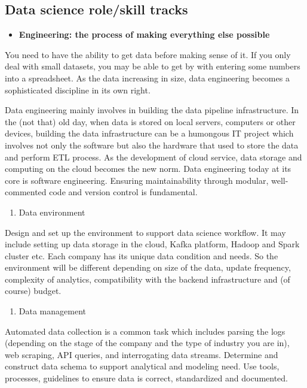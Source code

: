 \documentclass[12pt,]{krantz}
\providecommand{\tightlist}{%
  \setlength{\itemsep}{0pt}\setlength{\parskip}{0pt}}
\theoremstyle{definition}
\theoremstyle{definition}
\theoremstyle{definition}
\theoremstyle{remark}
\begin{document}
\subsection{Data science role/skill
tracks}\label{data-science-roleskill-tracks}

\begin{itemize}
\tightlist
\item
  \textbf{Engineering: the process of making everything else possible}
\end{itemize}

You need to have the ability to get data before making sense of it. If
you only deal with small datasets, you may be able to get by with
entering some numbers into a spreadsheet. As the data increasing in
size, data engineering becomes a sophisticated discipline in its own
right.

Data engineering mainly involves in building the data pipeline
infrastructure. In the (not that) old day, when data is stored on local
servers, computers or other devices, building the data infrastructure
can be a humongous IT project which involves not only the software but
also the hardware that used to store the data and perform ETL process.
As the development of cloud service, data storage and computing on the
cloud becomes the new norm. Data engineering today at its core is
software engineering. Ensuring maintainability through modular,
well-commented code and version control is fundamental.

\begin{enumerate}
\def\labelenumi{(\arabic{enumi})}
\tightlist
\item
  Data environment
\end{enumerate}

Design and set up the environment to support data science workflow. It
may include setting up data storage in the cloud, Kafka platform, Hadoop
and Spark cluster etc. Each company has its unique data condition and
needs. So the environment will be different depending on size of the
data, update frequency, complexity of analytics, compatibility with the
backend infrastructure and (of course) budget.

\begin{enumerate}
\def\labelenumi{(\arabic{enumi})}
\setcounter{enumi}{1}
\tightlist
\item
  Data management
\end{enumerate}

Automated data collection is a common task which includes parsing the
logs (depending on the stage of the company and the type of industry you
are in), web scraping, API queries, and interrogating data streams.
Determine and construct data schema to support analytical and modeling
need. Use tools, processes, guidelines to ensure data is correct,
standardized and documented.
\end{document}
